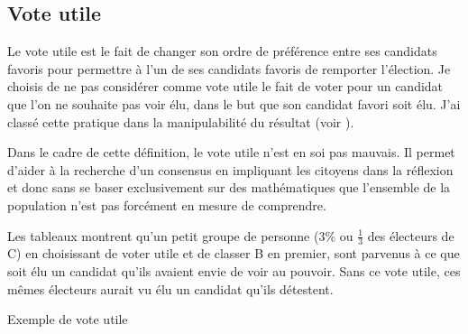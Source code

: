 \documentclass[../report]{subfiles}
\begin{document}
  \subsection{Vote utile}%
  \label{diff:comp:util:util}

  Le vote utile est le fait de changer son ordre de préférence entre ses candidats favoris pour
  permettre à l'un de ses candidats favoris de remporter l'élection. 
  Je choisis de ne pas considérer comme vote utile le fait de voter pour un candidat que l'on ne
  souhaite pas voir élu, dans le but que son candidat favori soit élu. J'ai classé cette pratique 
  dans la manipulabilité du résultat (voir ).

  Dans le cadre de cette définition, le vote utile n'est en soi pas mauvais.
  Il permet d'aider à la recherche d'un consensus en impliquant les citoyens dans la réflexion
  et donc sans se baser exclusivement sur des mathématiques que l'ensemble de la population n'est pas forcément
  en mesure de comprendre.

  Les tableaux  montrent qu'un petit groupe de personne (3\% ou $\frac{1}{3}$ des 
  électeurs de C) en choisissant de voter utile et de classer B en premier, sont parvenus à ce que soit élu un candidat qu'ils
  avaient envie de voir au pouvoir.
  Sans ce vote utile, ces mêmes électeurs aurait vu élu un candidat qu'ils détestent.

  \begin{table}[h]
	\begin{center}
		\caption{Exemple de vote utile}%
		\label{fig:critere:utile:example}
		\\[1em]
	\end{center}
  \end{table}
\end{document}
